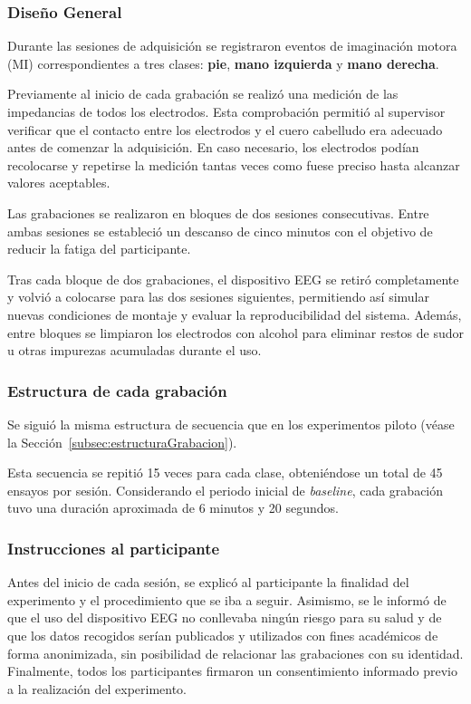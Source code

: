 \subsubsection{Diseño General}
Durante las sesiones de adquisición se registraron eventos de imaginación motora (MI) correspondientes a tres clases: \textbf{pie}, \textbf{mano izquierda} y \textbf{mano derecha}. 

Previamente al inicio de cada grabación se realizó una medición de las impedancias de todos los electrodos. Esta comprobación permitió al supervisor verificar que el contacto entre los electrodos y el cuero cabelludo era adecuado antes de comenzar la adquisición. En caso necesario, los electrodos podían recolocarse y repetirse la medición tantas veces como fuese preciso hasta alcanzar valores aceptables.

Las grabaciones se realizaron en bloques de dos sesiones consecutivas. Entre ambas sesiones se estableció un descanso de cinco minutos con el objetivo de reducir la fatiga del participante.

Tras cada bloque de dos grabaciones, el dispositivo EEG se retiró completamente y volvió a colocarse para las dos sesiones siguientes, permitiendo así simular nuevas condiciones de montaje y evaluar la reproducibilidad del sistema. Además, entre bloques se limpiaron los electrodos con alcohol para eliminar restos de sudor u otras impurezas acumuladas durante el uso.

\subsubsection{Estructura de cada grabación}
\label{subsubsec:estructura_grabación}

Se  siguió la misma estructura de secuencia que en los experimentos piloto  (véase la Sección~\ref{subsec:estructuraGrabacion}).

Esta secuencia se repitió 15 veces para cada clase, obteniéndose un total de 45 ensayos por sesión. Considerando el periodo inicial de \textit{baseline}, cada grabación tuvo una duración aproximada de 6 minutos y 20 segundos.

\subsubsection{Instrucciones al participante}
Antes del inicio de cada sesión, se explicó al participante la finalidad del experimento y el procedimiento que se iba a seguir. Asimismo, se le informó de que el uso del dispositivo EEG no conllevaba ningún riesgo para su salud y de que los datos recogidos serían publicados y utilizados con fines académicos de forma anonimizada, sin posibilidad de relacionar las grabaciones con su identidad. Finalmente, todos los participantes firmaron un consentimiento informado previo a la realización del experimento.

